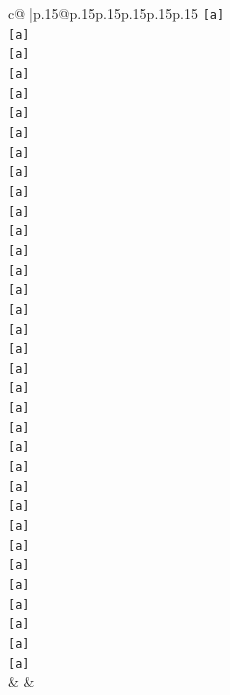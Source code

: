 \documentclass{article}
\begin{document}
{\begin{supertabular}{c@{$\;$}|p{.15\linewidth}@{}p{.15\linewidth}p{.15\linewidth}p{.15\linewidth}p{.15\linewidth}p{.15\linewidth}}
{{{\texttt{{[}a{]}} \\
\texttt{{[}a{]}} \\
\texttt{{[}a{]}} \\
\texttt{{[}a{]}} \\
\texttt{{[}a{]}} \\
\texttt{{[}a{]}} \\
\texttt{{[}a{]}} \\
\texttt{{[}a{]}} \\
\texttt{{[}a{]}} \\
\texttt{{[}a{]}} \\
\texttt{{[}a{]}} \\
\texttt{{[}a{]}} \\
\texttt{{[}a{]}} \\
\texttt{{[}a{]}} \\
\texttt{{[}a{]}} \\
\texttt{{[}a{]}} \\
\texttt{{[}a{]}} \\
\texttt{{[}a{]}} \\
\texttt{{[}a{]}} \\
\texttt{{[}a{]}} \\
\texttt{{[}a{]}} \\
\texttt{{[}a{]}} \\
\texttt{{[}a{]}} \\
\texttt{{[}a{]}} \\
\texttt{{[}a{]}} \\
\texttt{{[}a{]}} \\
\texttt{{[}a{]}} \\
\texttt{{[}a{]}} \\
\texttt{{[}a{]}} \\
\texttt{{[}a{]}} \\
\texttt{{[}a{]}} \\
\texttt{{[}a{]}} \\
\texttt{{[}a{]}} \\
\texttt{{[}a{]}} \\
            }
        }
    }
    & & \\ \\


\end{supertabular}}
\end{document}
